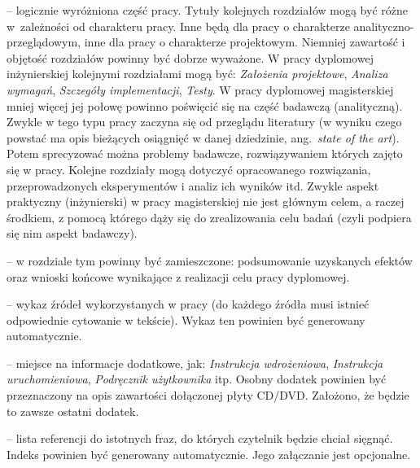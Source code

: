 \begin{description}[font=\normalfont\itshape,leftmargin=1.em,itemindent=1.em,labelwidth=1.5em]
\item[Rozdział] -- logicznie wyróżniona część pracy. Tytuły kolejnych rozdziałów mogą być różne w~zależności od charakteru pracy. Inne będą dla pracy o charakterze analityczno-przeglądowym, inne dla pracy o charakterze projektowym. Niemniej zawartość i objętość rozdziałów powinny być dobrze wyważone. W pracy dyplomowej inżynierskiej kolejnymi rozdziałami mogą być: \emph{Założenia projektowe}, \emph{Analiza wymagań}, \emph{Szczegóły implementacji}, \emph{Testy}. W pracy dyplomowej magisterskiej mniej więcej jej połowę powinno poświęcić się na część badawczą (analityczną). Zwykle w tego typu pracy zaczyna się od przeglądu literatury (w wyniku czego powstać ma opis bieżących osiągnięć w danej dziedzinie, ang.~\emph{state of the art}). Potem sprecyzować można problemy badawcze, rozwiązywaniem których zajęto się w pracy. Kolejne rozdziały mogą dotyczyć opracowanego rozwiązania, przeprowadzonych eksperymentów i analiz ich wyników itd. Zwykle aspekt praktyczny (inżynierski) w pracy magisterskiej nie jest głównym celem, a raczej środkiem, z pomocą którego dąży się do zrealizowania celu badań (czyli podpiera się nim aspekt badawczy). 
\item[Podsumowanie] -- w rozdziale tym powinny być zamieszczone: podsumowanie uzyskanych efektów oraz wnioski końcowe wynikające z realizacji celu pracy dyplomowej.
\item[Literatura] -- wykaz źródeł wykorzystanych w pracy (do każdego źródła musi istnieć odpowiednie cytowanie w tekście). Wykaz ten powinien być generowany automatycznie.
\item[Dodatek] -- miejsce na informacje dodatkowe, jak: \emph{Instrukcja wdrożeniowa}, \emph{Instrukcja uruchomieniowa}, \emph{Podręcznik użytkownika} itp.
Osobny dodatek powinien być przeznaczony na opis zawartości dołączonej płyty CD/DVD. Założono, że będzie to zawsze ostatni dodatek.
\item[Indeks rzeczowy] -- lista referencji do istotnych fraz, do których czytelnik będzie chciał sięgnąć. Indeks powinien być generowany automatycznie. Jego załączanie jest opcjonalne.
\end{description}

